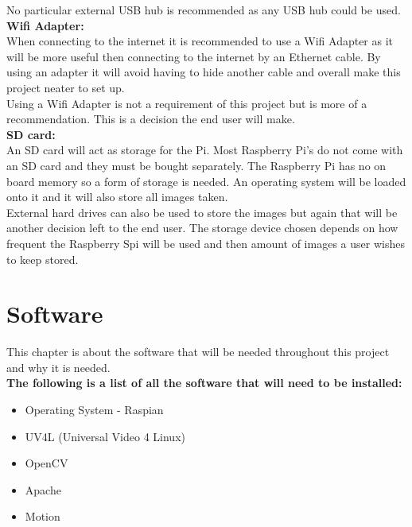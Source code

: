 \documentclass[]{report}
\begin{document}
No particular external USB hub is recommended as any USB hub could be used.\\

\noindent
{\bf Wifi Adapter:}\\
\break
When connecting to the internet it is recommended to use a Wifi Adapter as it will be more useful then connecting to the internet by an Ethernet cable. By using an adapter it will avoid having to hide another cable and overall make this project neater to set up.\\

Using a Wifi Adapter is not a requirement of this project but is more of a recommendation. This is a decision the end user will make.\\

\noindent
{\bf SD card:}\\
\break
An SD card will act as storage for the Pi. Most Raspberry Pi's do not come with an SD card and they must be bought separately. The Raspberry Pi has no on board memory so a form of storage is needed. An operating system will be loaded onto it and it will also store all images taken.\\

External hard drives can also be used to store the images but again that will be another decision left to the end user. The storage device chosen depends on how frequent the Raspberry Spi will be used and then amount of images a user wishes to keep stored.\\



\clearpage
\section{Software}	
\label{sec:software}	
This chapter is about the software that will be needed throughout this project and why it is needed.\\

{\bf The following is a list of all the software that will need to be installed:}
\begin{itemize}
  \item Operating System - Raspian \\
  \item UV4L (Universal Video 4 Linux)\\  
  \item OpenCV\\
  \item Apache\\
  \item Motion\\
\end{itemize}
\end{document}
